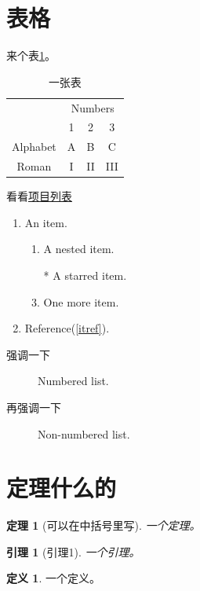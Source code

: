 \documentclass{ctexart}
\theoremstyle{plain} 		     %
\newtheorem{theorem}{定理}[section]
\newtheorem{lemma}{引理}[section]
\theoremstyle{definition} 		 %
\newtheorem{definition}{定义}[section]
\theoremstyle{remark} 			 %
\begin{document}
\section{表格}
来个表\ref{tab:1}。

\begin{table}[htbp]
	\centering
	\caption{一张表}
	\label{tab:1}
	\begin{tabular}{cccc}
		\toprule
		& \multicolumn{3}{c}{Numbers} \\
		\cmidrule{2-4}
		& 1 & 2 & 3 \\
		\midrule
		Alphabet & A & B & C \\
		Roman & I & II& III \\
		\bottomrule
	\end{tabular}
\end{table}

看看\hyperref[item]{项目列表}
\begin{enumerate}
	\label{item}
	\item An item.
	\begin{enumerate}
		\item A nested item.\label{itref}
		\item[*] A starred item.
		\item  One more item.
	\end{enumerate}
	\item Reference(\ref{itref}).
\end{enumerate}


\begin{description}
	\item[强调一下] Numbered list.
	\item[再强调一下] Non-numbered list.
\end{description}

\section{定理什么的}
\begin{theorem}[可以在中括号里写]
	\label{the:1}
	一个定理。
\end{theorem}

\begin{lemma}[引理1]
	\label{lem:1}
	一个引理。
\end{lemma}

\begin{definition}
	\label{def:1}
	一个定义。
\end{definition}
\end{document}
